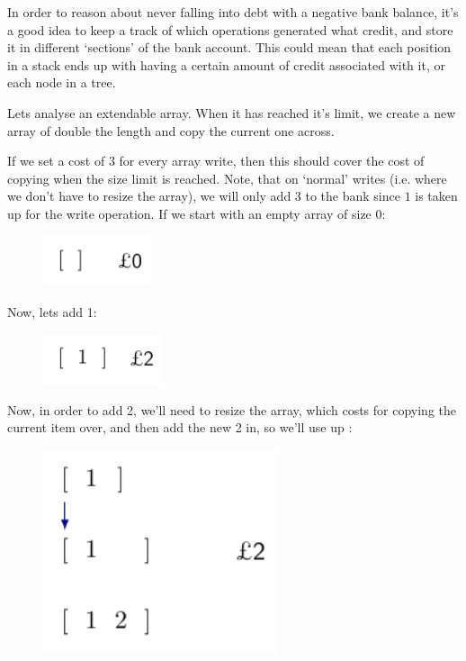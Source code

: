 In order to reason about never falling into debt with a negative bank balance,
it's a good idea to keep a track of which operations generated what credit, and
store it in different `sections' of the bank account. This could mean that each
position in a stack ends up with having a certain amount of credit associated
with it, or each node in a tree.

Lets analyse an extendable array. When it has reached it's limit, we create a
new array of double the length and copy the current one across.

If we set a cost of $3$ for every array write, then this should cover the cost
of copying when the size limit is reached. Note, that on `normal' writes (i.e.
where we don't have to resize the array), we will only add $3$ to the bank since
\textsterling $1$ is taken up for the write operation. If we start with an empty
array of size 0:

\begin{figure}[H]
  \centering
  \includegraphics[height=15mm]{diagrams/banker0.pdf}
  \label{banker0}
\end{figure}

Now, lets add 1:

\begin{figure}[H]
  \centering
  \includegraphics[height=15mm]{diagrams/banker1.pdf}
  \label{banker1}
\end{figure}

Now, in order to add 2, we'll need to resize the array, which costs
 for copying the current item over, and then add the new 2 in, so
we'll use up :

\begin{figure}[H]
  \centering
  \includegraphics[height=60mm]{diagrams/banker2.pdf}
  \label{banker2}
\end{figure}

